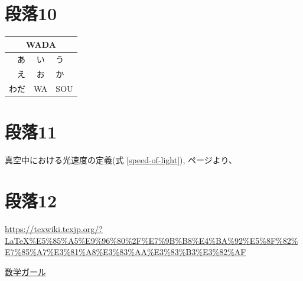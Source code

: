 \documentclass[a4paper,11pt]{jsarticle}
\begin{document}
\section{段落10}
\begin{tabular}{|r|c|l|} \hline
  \multicolumn{3}{|c|}{WADA}\\ \hline
  あ & い & う\\ \hline
  え & お & か\\
  わだ & WA & SOU\\ \hline
\end{tabular}
\section{段落11}
真空中における光速度の定義(式 \ref{speed-of-light}), \pageref{speed-of-light}ページより、
\par
\section{段落12}
\url{https://texwiki.texjp.org/?LaTeX%E5%85%A5%E9%96%80%2F%E7%9B%B8%E4%BA%92%E5%8F%82%E7%85%A7%E3%81%A8%E3%83%AA%E3%83%B3%E3%82%AF}
\par
\href{http://www.hyuki.com/girl/}{数学ガール}
\par
\end{document}

